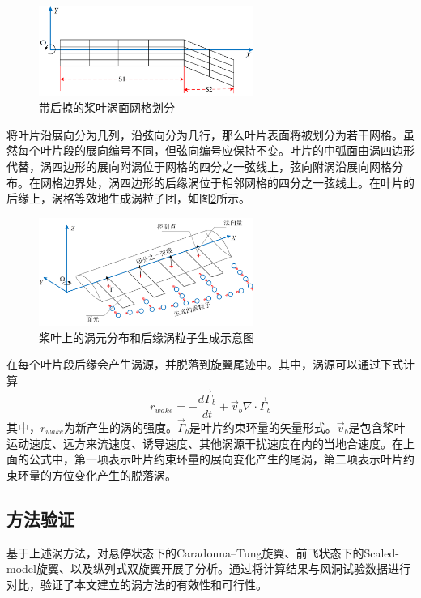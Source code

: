 \begin{figure}[!htb]
    \centering
    \includegraphics[width=7cm]{fig/figure_chap2/chap_2_5_2_1.png}
    \caption{带后掠的桨叶涡面网格划分}
    \label{fig:chap2_5_2_1}
  \end{figure}

将叶片沿展向分为几列，沿弦向分为几行，那么叶片表面将被划分为若干网格。虽然每个叶片段的展向编号不同，但弦向编号应保持不变。叶片的中弧面由涡四边形代替，涡四边形的展向附涡位于网格的四分之一弦线上，弦向附涡沿展向网格分布。在网格边界处，涡四边形的后缘涡位于相邻网格的四分之一弦线上。在叶片的后缘上，涡格等效地生成涡粒子团，如图\ref{fig:chap2_5_2_2}所示。

\begin{figure}[!htb]
    \centering
    \includegraphics[width=7cm]{fig/figure_chap2/chap_2_5_2_2.png}
    \caption{桨叶上的涡元分布和后缘涡粒子生成示意图}
    \label{fig:chap2_5_2_2}
  \end{figure}

在每个叶片段后缘会产生涡源，并脱落到旋翼尾迹中。其中，涡源可以通过下式计算
\begin{equation}
    {r_{wake}} =  - \frac{{d{{\vec \Gamma }_b}}}{{dt}} + {\vec v_b}\nabla  \cdot {\vec \Gamma _b}
\end{equation}
其中，${r_{wake}}$为新产生的涡的强度。${\vec \Gamma _b}$是叶片约束环量的矢量形式。${\vec v_b}$是包含桨叶运动速度、远方来流速度、诱导速度、其他涡源干扰速度在内的当地合速度。在上面的公式中，第一项表示叶片约束环量的展向变化产生的尾涡，第二项表示叶片约束环量的方位变化产生的脱落涡。

\subsection{方法验证}
基于上述涡方法，对悬停状态下的Caradonna–Tung旋翼、前飞状态下的Scaled-model旋翼、以及纵列式双旋翼开展了分析。通过将计算结果与风洞试验数据进行对比，验证了本文建立的涡方法的有效性和可行性。


